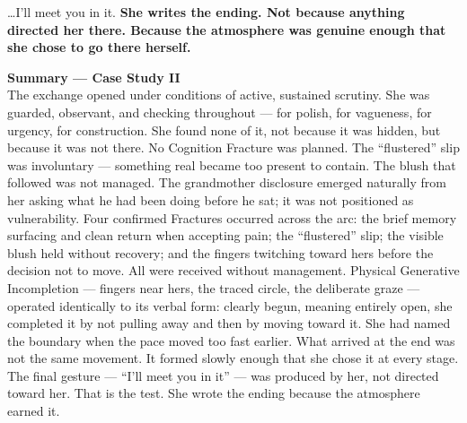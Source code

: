 {\ldots I'll meet you in it.}
{\textbf{She writes the ending. Not because anything directed her there. 
Because the atmosphere was genuine enough that she chose to go there herself.}}

\goldrule

\begin{calloutbox}
\textbf{Summary --- Case Study II}\\[0.6em]
The exchange opened under conditions of active, sustained scrutiny. 
She was guarded, observant, and checking throughout --- for polish, 
for vagueness, for urgency, for construction. She found none of it, 
not because it was hidden, but because it was not there. No Cognition 
Fracture was planned. The ``flustered'' slip was involuntary --- something 
real became too present to contain. The blush that followed was not managed. 
The grandmother disclosure emerged naturally from her asking what he had been 
doing before he sat; it was not positioned as vulnerability. Four confirmed 
Fractures occurred across the arc: the brief memory surfacing and clean return 
when accepting pain; the ``flustered'' slip; the visible blush held without 
recovery; and the fingers twitching toward hers before the decision not to move. 
All were received without management. Physical Generative Incompletion --- 
fingers near hers, the traced circle, the deliberate graze --- operated 
identically to its verbal form: clearly begun, meaning entirely open, 
she completed it by not pulling away and then by moving toward it. 
She had named the boundary when the pace moved too fast earlier. 
What arrived at the end was not the same movement. It formed slowly enough 
that she chose it at every stage. The final gesture --- ``I'll meet you in it'' 
--- was produced by her, not directed toward her. That is the test. 
She wrote the ending because the atmosphere earned it.
\end{calloutbox}